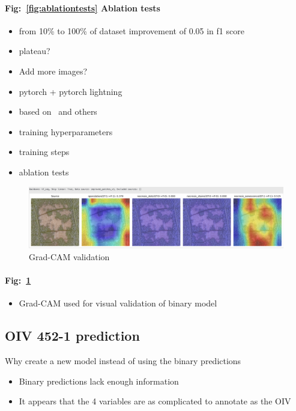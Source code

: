 \documentclass[english]{article}
\begin{document}
\paragraph{Fig:~\ref{fig:ablationtests} Ablation tests}
\begin{itemize}
	\item from 10\% to 100\% of dataset improvement of 0.05 in f1 score
	\item plateau?
	\item Add more images?
\end{itemize}

\begin{itemize}
	\item pytorch + pytorch lightning
	\item based on~\parencite{dosovitskiyImageWorth16x162021} and others
	\item training hyperparameters
	\item training steps
	\item ablation tests
\end{itemize}

\begin{figure}[H]
	\centering
	\includegraphics[width=0.8\linewidth]{gc_hf_seg_sen_high.png}
	\caption{Grad-CAM validation}\label{fig:gradcamval}
\end{figure}

\paragraph{Fig:~\ref{fig:gradcamval}}
\begin{itemize}
	\item Grad-CAM used for visual validation of binary model
\end{itemize}

\subsection{OIV 452-1 prediction}

Why create a new model instead of using the binary predictions
\begin{itemize}
    \item Binary predictions lack enough information
    \item It appears that the 4 variables are as complicated to annotate as the OIV
\end{itemize}
\end{document}
